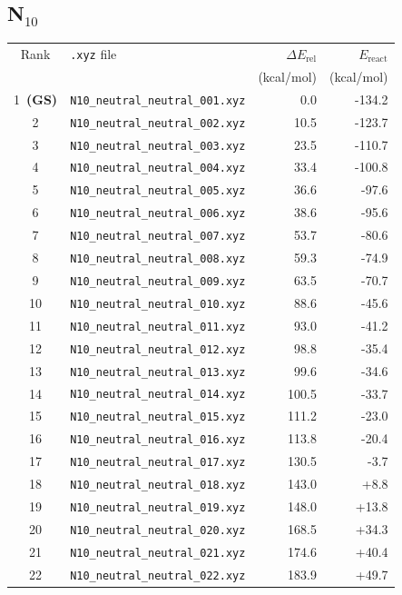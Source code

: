 \documentclass[11pt,a4paper]{article}
\begin{document}
\subsection*{N$_{10}$}
\begin{longtable}{clrr}
\toprule
Rank & \texttt{.xyz} file & $\Delta E_\text{rel}$ & $E_\text{react}$ \\
 & & (kcal/mol) & (kcal/mol) \\
\midrule\endhead
\rowcolor{gs}1~\textbf{(GS)} & \texttt{N10\_neutral\_neutral\_001.xyz} & 0.0 & -134.2 \\
2 & \texttt{N10\_neutral\_neutral\_002.xyz} & 10.5 & -123.7 \\
3 & \texttt{N10\_neutral\_neutral\_003.xyz} & 23.5 & -110.7 \\
4 & \texttt{N10\_neutral\_neutral\_004.xyz} & 33.4 & -100.8 \\
5 & \texttt{N10\_neutral\_neutral\_005.xyz} & 36.6 & -97.6 \\
6 & \texttt{N10\_neutral\_neutral\_006.xyz} & 38.6 & -95.6 \\
7 & \texttt{N10\_neutral\_neutral\_007.xyz} & 53.7 & -80.6 \\
8 & \texttt{N10\_neutral\_neutral\_008.xyz} & 59.3 & -74.9 \\
9 & \texttt{N10\_neutral\_neutral\_009.xyz} & 63.5 & -70.7 \\
10 & \texttt{N10\_neutral\_neutral\_010.xyz} & 88.6 & -45.6 \\
11 & \texttt{N10\_neutral\_neutral\_011.xyz} & 93.0 & -41.2 \\
12 & \texttt{N10\_neutral\_neutral\_012.xyz} & 98.8 & -35.4 \\
13 & \texttt{N10\_neutral\_neutral\_013.xyz} & 99.6 & -34.6 \\
14 & \texttt{N10\_neutral\_neutral\_014.xyz} & 100.5 & -33.7 \\
15 & \texttt{N10\_neutral\_neutral\_015.xyz} & 111.2 & -23.0 \\
16 & \texttt{N10\_neutral\_neutral\_016.xyz} & 113.8 & -20.4 \\
17 & \texttt{N10\_neutral\_neutral\_017.xyz} & 130.5 & -3.7 \\
18 & \texttt{N10\_neutral\_neutral\_018.xyz} & 143.0 & +8.8 \\
19 & \texttt{N10\_neutral\_neutral\_019.xyz} & 148.0 & +13.8 \\
20 & \texttt{N10\_neutral\_neutral\_020.xyz} & 168.5 & +34.3 \\
21 & \texttt{N10\_neutral\_neutral\_021.xyz} & 174.6 & +40.4 \\
22 & \texttt{N10\_neutral\_neutral\_022.xyz} & 183.9 & +49.7 \\
\bottomrule
\end{longtable}
\end{document}
